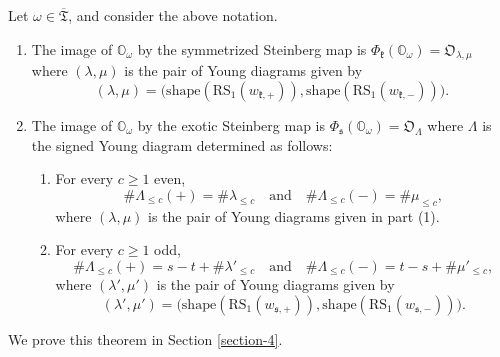 \documentclass[ALCO,Unicode]{cedram}
\newcommand{\fk}{\mathfrak{k}}
\newcommand{\fs}{\mathfrak{s}}
\newcommand{\RS}{\mathrm{RS}}
\newcommand{\shape}{\mathrm{shape}}
\newcommand{\nrboxes}[2]{\# #1_{\leq #2}}
\newcommand{\nrplus}[2]{\# #1_{\leq #2}(+)}
\newcommand{\nrminus}[2]{\# #1_{\leq #2}(-)}
\newcommand{\Xorbit}{\mathbb{O}}
\newcommand{\Nkorbit}{\mathfrak{O}}
\newcommand{\Nsorbit}{\mathfrak{O}}
\newcommand{\ppermutationsof}{\mathfrak{T}}
\newcommand{\parameters}{\overline{\ppermutationsof}}
\begin{document}
\begin{theorem}
\label{T2}
Let $\omega\in\parameters$, and consider the above notation.
\begin{enumerate}[label=(\arabic*)]
\item \label{it2vvt1}
The image of $\Xorbit_\omega$ by the symmetrized Steinberg map is  $\Phi_\fk(\Xorbit_\omega)=\Nkorbit_{\lambda,\mu}$ where $(\lambda,\mu)$ is the pair of Young diagrams given by
\[
(\lambda,\mu)=\big(
\shape(\RS_1(w_{\fk,+})),\shape(\RS_1(w_{\fk,-}))\big).
\]
\item \label{it2vvt2} The image of $\Xorbit_\omega$ by the exotic Steinberg map is $\Phi_\fs(\Xorbit_\omega)=\Nsorbit_\Lambda$ where $\Lambda$ is the signed Young diagram determined as follows:
\begin{enumerate}
\item For every $c\geq 1$ even,
\[
\nrplus{\Lambda}{c}=\nrboxes{\lambda}{c}\quad\mbox{and}\quad \nrminus{\Lambda}{c}=\nrboxes{\mu}{c},
\]
where $(\lambda,\mu)$ is the pair of Young diagrams given in part {\rm (1)}.
\item For every $c\geq 1$ odd,
\[
\nrplus{\Lambda}{c}=s-t+\nrboxes{\lambda'}{c}\quad\mbox{and}\quad \nrminus{\Lambda}{c}=t-s+\nrboxes{\mu'}{c},
\]
where $(\lambda',\mu')$ is the pair of Young diagrams given by
\[(\lambda',\mu')=\big(\shape(\RS_1(w_{\fs,+})),\shape(\RS_1(w_{\fs,-}))\big).\]
\end{enumerate}
\end{enumerate}
\end{theorem}

We prove this theorem in Section \ref{section-4}.
\end{document}

